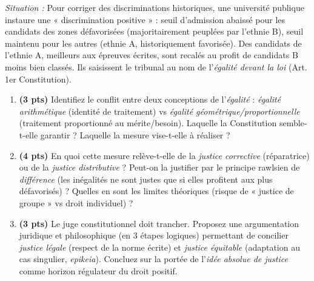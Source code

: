 \documentclass[11pt]{article}
\begin{document}
\begin{exercice}
\textit{Situation :} Pour corriger des discriminations historiques, une université publique instaure une « discrimination positive » : seuil d'admission abaissé pour les candidats des zones défavorisées (majoritairement peuplées par l'ethnie B), seuil maintenu pour les autres (ethnie A, historiquement favorisée). Des candidats de l'ethnie A, meilleurs aux épreuves écrites, sont recalés au profit de candidats B moins bien classés. Ils saisissent le tribunal au nom de l'\textit{égalité devant la loi} (Art. 1er Constitution).
\begin{enumerate}
    \item \textbf{(3 pts)} Identifiez le conflit entre deux conceptions de l'\textit{égalité} : \textit{égalité arithmétique} (identité de traitement) vs \textit{égalité géométrique/proportionnelle} (traitement proportionné au mérite/besoin). Laquelle la Constitution semble-t-elle garantir ? Laquelle la mesure vise-t-elle à réaliser ?
    \item \textbf{(4 pts)} En quoi cette mesure relève-t-elle de la \textit{justice corrective} (réparatrice) ou de la \textit{justice distributive} ? Peut-on la justifier par le principe rawlsien de \textit{différence} (les inégalités ne sont justes que si elles profitent aux plus défavorisés) ? Quelles en sont les limites théoriques (risque de « justice de groupe » vs droit individuel) ?
    \item \textbf{(3 pts)} Le juge constitutionnel doit trancher. Proposez une argumentation juridique et philosophique (en 3 étapes logiques) permettant de concilier \textit{justice légale} (respect de la norme écrite) et \textit{justice équitable} (adaptation au cas singulier, \textit{epikeia}). Concluez sur la portée de l'\textit{idée absolue de justice} comme horizon régulateur du droit positif.
\end{enumerate}
\end{exercice}
\end{document}
